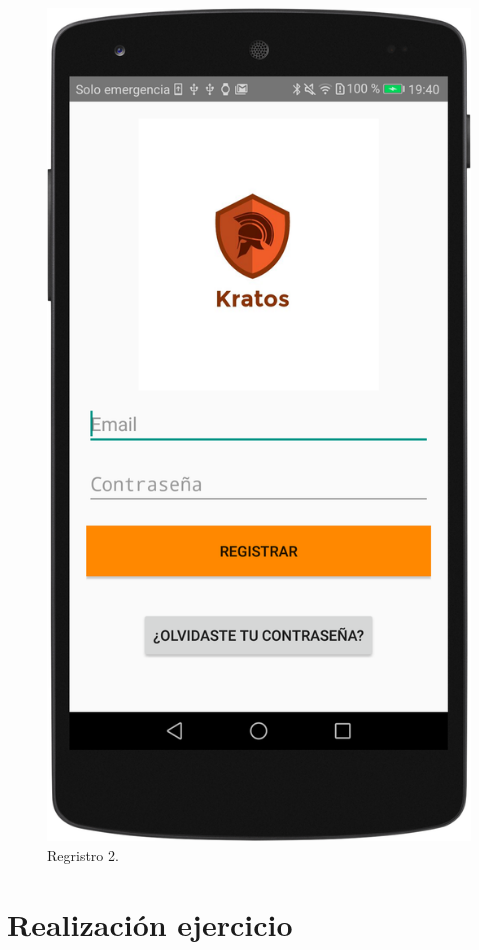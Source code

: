 \begin{figure}[H]
	\centering
	\includegraphics[scale=0.11]{imagenes/registro.png}
	\caption{Regristro 2.}
	\label{Regristro 2}
\end{figure}

\section{Realización ejercicio}

